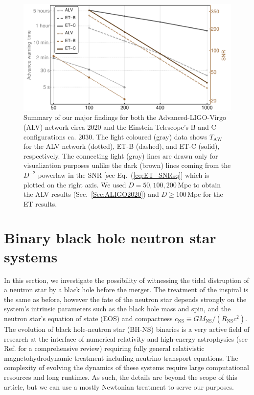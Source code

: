 \documentclass[amsmath,amssymb,aps,floats,amsfonts,notitlepage,superscriptaddress,eqsecnum,nofootinbib,10pt]{revtex4-1}
\begin{document}
\begin{figure}[h!]
\includegraphics[width=\linewidth]{../Figures/Main_results.pdf}
\caption{Summary of our major findings for both the Advanced-LIGO-Virgo (ALV) network circa 2020 and the Einstein Telescope's B and C configurations
ca. 2030. The light coloured (gray) data shows $T_\text{AW}$ for the ALV network (dotted), ET-B (dashed), and ET-C (solid), respectively.
The connecting light (gray) lines are drawn only for visualization purposes unlike the dark (brown) lines coming from the $D^{-2}$ powerlaw in the SNR [see Eq.~(\ref{eq:ET_SNRsq}] which is plotted on the right axis. 
We used $D=50,100,200\,$Mpc to obtain the ALV results (Sec.~\ref{Sec:ALIGO2020}) and $D\ge 100\,$Mpc for the ET results.}\label{fig:summary}
\label{fig:summary}
\end{figure}





\section{Binary black hole neutron star systems}
In this section, we investigate the possibility of witnessing the tidal distruption of a neutron star by a black hole before the merger.
The treatment of the inspiral is the same as before, however the fate of the neutron star depends strongly on the system's intrinsic parameters
such as the black hole mass and spin, and the neutron star's equation of state (EOS) and compactness $c_\text{NS}\equiv G M_\text{NS}/(R_\text{NS}c^2)$. 
The evolution of black hole-neutron star (BH-NS) binaries is a very active field of research at the interface of numerical relativity and high-energy astrophysics
(see Ref. \cite{Shibata:2011jka} for a comprehensive review) requiring fully general relativistic magnetohydrodynamic treatment including neutrino transport equations.
The complexity of evolving the dynamics of these systems require large computational resources and long runtimes.
As such, the details are beyond the scope of this article, but we can use a mostly Newtonian treatment to serve our purposes. %
\end{document}
